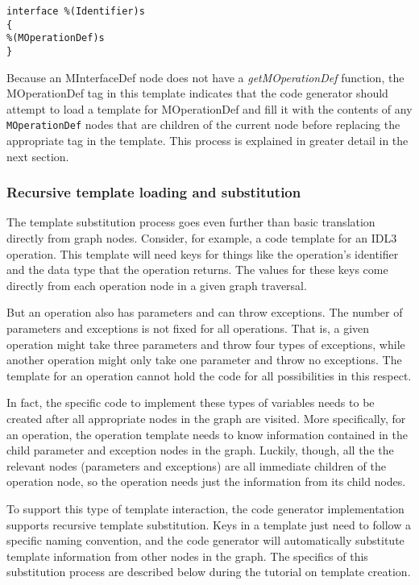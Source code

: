 \begin{verbatim}
interface %(Identifier)s
{
%(MOperationDef)s
}
\end{verbatim}

Because an MInterfaceDef node does not have a {\it getMOperationDef\/} function,
the {\sf MOperationDef} tag in this template indicates that the code generator
should attempt to load a template for MOperationDef and fill it with the
contents of any {\tt MOperationDef} nodes that are children of the current node
before replacing the appropriate tag in the template. This process is explained
in greater detail in the next section.


\subsubsection{Recursive template loading and substitution}

The template substitution process goes even further than basic translation
directly from graph nodes. Consider, for example, a code template for an IDL3
operation. This template will need keys for things like the operation's
identifier and the data type that the operation returns. The values for these
keys come directly from each operation node in a given graph traversal.

But an operation also has parameters and can throw exceptions. The number of
parameters and exceptions is not fixed for all operations. That is, a given
operation might take three parameters and throw four types of exceptions, while
another operation might only take one parameter and throw no exceptions. The
template for an operation cannot hold the code for all possibilities in this
respect.

In fact, the specific code to implement these types of variables needs to be
created after all appropriate nodes in the graph are visited. More specifically,
for an operation, the operation template needs to know information contained in
the child parameter and exception nodes in the graph. Luckily, though, all the
the relevant nodes (parameters and exceptions) are all immediate children of the
operation node, so the operation needs just the information from its child
nodes.

To support this type of template interaction, the code generator implementation
supports recursive template substitution. Keys in a template just need to follow
a specific naming convention, and the code generator will automatically
substitute template information from other nodes in the graph. The specifics of
this substitution process are described below during the tutorial on template
creation.

